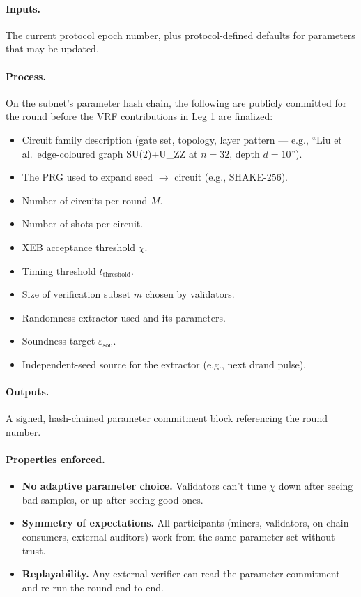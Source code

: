 \documentclass[11pt]{article}
\begin{document}
\paragraph{Inputs.} The current protocol epoch number, plus protocol-defined defaults for parameters that may be updated.

\paragraph{Process.} On the subnet's parameter hash chain, the following are publicly committed for the round before the VRF contributions in Leg 1 are finalized:

\begin{itemize}
    \item Circuit family description (gate set, topology, layer pattern --- e.g., ``Liu et al.\ edge-coloured graph SU(2)+U\_ZZ at $n=32$, depth $d=10$'').
    \item The PRG used to expand seed $\to$ circuit (e.g., SHAKE-256).
    \item Number of circuits per round $M$.
    \item Number of shots per circuit.
    \item XEB acceptance threshold $\chi$.
    \item Timing threshold $t_{\text{threshold}}$.
    \item Size of verification subset $m$ chosen by validators.
    \item Randomness extractor used and its parameters.
    \item Soundness target $\varepsilon_{\text{sou}}$.
    \item Independent-seed source for the extractor (e.g., next drand pulse).
\end{itemize}

\paragraph{Outputs.} A signed, hash-chained parameter commitment block referencing the round number.

\paragraph{Properties enforced.}
\begin{itemize}
    \item \textbf{No adaptive parameter choice.} Validators can't tune $\chi$ down after seeing bad samples, or up after seeing good ones.
    \item \textbf{Symmetry of expectations.} All participants (miners, validators, on-chain consumers, external auditors) work from the same parameter set without trust.
    \item \textbf{Replayability.} Any external verifier can read the parameter commitment and re-run the round end-to-end.
\end{itemize}
\end{document}
